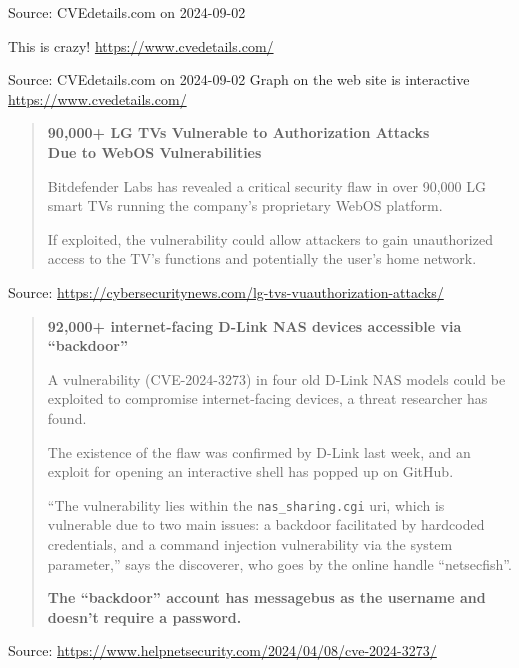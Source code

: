 \documentclass[Screen16to9,17pt]{foils}
\begin{document}
Source: CVEdetails.com on 2024-09-02

\begin{list2}
\item This is crazy! \url{https://www.cvedetails.com/}
\end{list2}


Source: CVEdetails.com on 2024-09-02 Graph on the web site is interactive \url{https://www.cvedetails.com/}



\begin{quote}{\large\bf
90,000+ LG TVs Vulnerable to Authorization Attacks\\
Due to WebOS Vulnerabilities}

Bitdefender Labs has revealed a critical security flaw in over 90,000 LG smart TVs running the company’s proprietary WebOS platform.

If exploited, the vulnerability could allow attackers to gain unauthorized access to the TV’s functions and potentially the user’s home network.

\end{quote}
Source: \url{https://cybersecuritynews.com/lg-tvs-vuauthorization-attacks/}




\begin{quote}{\large\bf
92,000+ internet-facing D-Link NAS devices accessible via “backdoor”}

A vulnerability (CVE-2024-3273) in four old D-Link NAS models could be exploited to compromise internet-facing devices, a threat researcher has found.

The existence of the flaw was confirmed by D-Link last week, and an exploit for opening an interactive shell has popped up on GitHub.

“The vulnerability lies within the \verb+nas_sharing.cgi+ uri, which is vulnerable due to two main issues: a backdoor facilitated by hardcoded credentials, and a command injection vulnerability via the system parameter,” says the discoverer, who goes by the online handle “netsecfish”.

{\bf The “backdoor” account has messagebus as the username and doesn’t require a password.}
\end{quote}
Source: \url{https://www.helpnetsecurity.com/2024/04/08/cve-2024-3273/}
\end{document}
